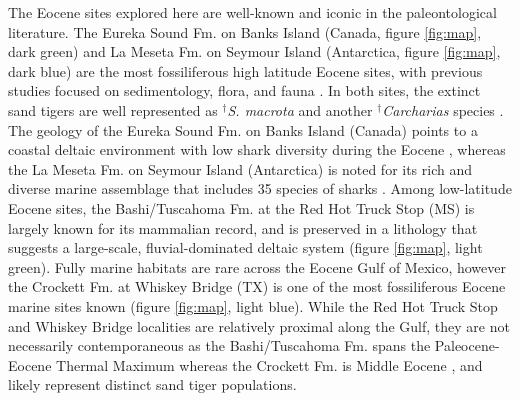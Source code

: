 \documentclass[]{rsos}%
\begin{document}
The Eocene sites explored here are well-known and iconic in the paleontological literature. 
The Eureka Sound Fm. on Banks Island (Canada, figure \ref{fig:map}, dark green) and La Meseta Fm. on Seymour Island (Antarctica, figure \ref{fig:map}, dark blue) are the most fossiliferous high latitude Eocene sites, with previous studies focused on sedimentology, flora, and fauna \cite{cantrill2012vegetation, eberle2012life}.
In both sites, the extinct sand tigers are well represented as ${}^\dag$\emph{S. macrota} and another ${}^\dag$\emph{Carcharias} species \cite{Padilla2014, Kriwet2016}. %
The geology of the Eureka Sound Fm. on Banks Island (Canada) points to a coastal deltaic environment with low shark diversity during the Eocene \cite{Padilla2014}, whereas the La Meseta Fm. on Seymour Island (Antarctica) is noted for its rich and diverse marine assemblage that includes 35 species of sharks \cite{Kriwet2016}.
Among low-latitude Eocene sites, the Bashi/Tuscahoma Fm. at the Red Hot Truck Stop (MS) is largely known for its mammalian record, and is preserved in a lithology that suggests a large-scale, fluvial-dominated deltaic system \cite{Beard2009} (figure \ref{fig:map}, light green).
Fully marine habitats are rare across the Eocene Gulf of Mexico, however the Crockett Fm. at Whiskey Bridge (TX) is one of the most fossiliferous Eocene marine sites known \cite{Flis2017}(figure \ref{fig:map}, light blue).
While the Red Hot Truck Stop and Whiskey Bridge localities are relatively proximal along the Gulf, they are not necessarily contemporaneous as the Bashi/Tuscahoma Fm. spans the Paleocene-Eocene Thermal Maximum \cite{Beard2009} whereas the Crockett Fm. is Middle Eocene \cite{Flis2017}, and likely represent distinct sand tiger populations.
\end{document}
